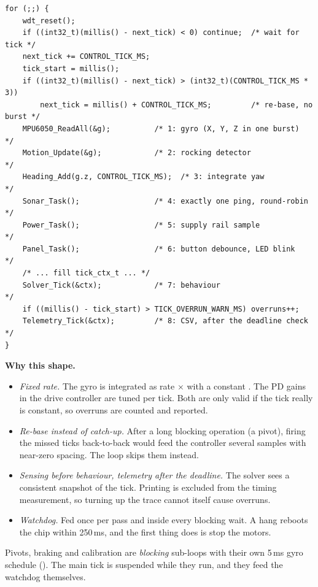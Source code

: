 \documentclass[11pt,a4paper]{article}
\newcommand{\code}[1]{\texttt{\detokenize{#1}}}
\theoremstyle{plain}
\theoremstyle{definition}
\begin{document}
\begin{lstlisting}[numbers=none]
for (;;) {
    wdt_reset();
    if ((int32_t)(millis() - next_tick) < 0) continue;  /* wait for tick */
    next_tick += CONTROL_TICK_MS;
    tick_start = millis();
    if ((int32_t)(millis() - next_tick) > (int32_t)(CONTROL_TICK_MS * 3))
        next_tick = millis() + CONTROL_TICK_MS;         /* re-base, no burst */
    MPU6050_ReadAll(&g);          /* 1: gyro (X, Y, Z in one burst)     */
    Motion_Update(&g);            /* 2: rocking detector                 */
    Heading_Add(g.z, CONTROL_TICK_MS);  /* 3: integrate yaw             */
    Sonar_Task();                 /* 4: exactly one ping, round-robin    */
    Power_Task();                 /* 5: supply rail sample               */
    Panel_Task();                 /* 6: button debounce, LED blink       */
    /* ... fill tick_ctx_t ... */
    Solver_Tick(&ctx);            /* 7: behaviour                        */
    if ((millis() - tick_start) > TICK_OVERRUN_WARN_MS) overruns++;
    Telemetry_Tick(&ctx);         /* 8: CSV, after the deadline check    */
}
\end{lstlisting}

\textbf{Why this shape.}
\begin{itemize}
  \item \emph{Fixed rate.} The gyro is integrated as rate $\times$ \code{dt}
        with a constant \code{dt}. The PD gains in the drive controller are
        tuned per tick. Both are only valid if the tick really is constant,
        so overruns are counted and reported.
  \item \emph{Re-base instead of catch-up.} After a long blocking operation
        (a pivot), firing the missed ticks back-to-back would feed the
        controller several samples with near-zero spacing. The loop skips
        them instead.
  \item \emph{Sensing before behaviour, telemetry after the deadline.} The
        solver sees a consistent snapshot of the tick. Printing is excluded
        from the timing measurement, so turning up the trace cannot itself
        cause overruns.
  \item \emph{Watchdog.} Fed once per pass and inside every blocking wait.
        A hang reboots the chip within 250\,ms, and the first thing
        \code{main} does is stop the motors.
\end{itemize}

Pivots, braking and calibration are \emph{blocking} sub-loops with their
own 5\,ms gyro schedule (\code{TURN_TICK_MS}). The main tick is suspended
while they run, and they feed the watchdog themselves.
\end{document}

